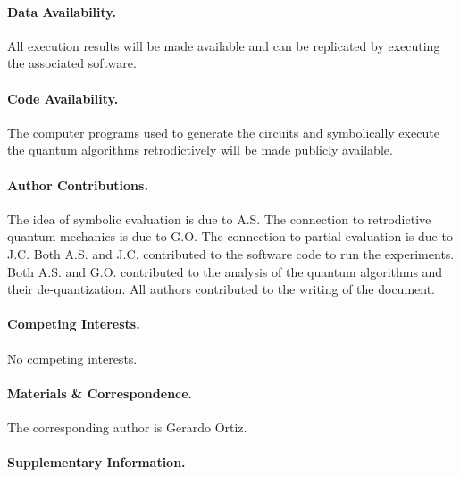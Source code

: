 \documentclass{article}
\newcommand{\red}[1]{{\color{red}{#1}}}
\newcommand{\todo}[1]{\fbox{\begin{minipage}{40em}{\red{#1}}\end{minipage}}}
\begin{document}
\begin{refsection}
\todo{

observer 1 measures wires a,b; obs2 measures wires b,c; not commuting;
each obs gives partial solution to equations; but partial solutions
cannot lead to a global solution
 
KS suggests that equations do not have unique solutions; only
materialize when you measure;

can associate a probability with each variable in a equation: look at
all solutions and see the contribution of each variable to these
solutions.

}

\paragraph*{Data Availability.}
All execution results will be made available and can be replicated by
executing the associated software.

\paragraph*{Code Availability.}
The computer programs used to generate the circuits and symbolically
execute the quantum algorithms retrodictively will be made publicly
available.

\paragraph*{Author Contributions.}
The idea of symbolic evaluation is due to A.S. The connection to
retrodictive quantum mechanics is due to G.O. The connection to
partial evaluation is due to J.C. Both A.S. and J.C. contributed to
the software code to run the experiments. Both A.S. and
G.O. contributed to the analysis of the quantum algorithms and their
de-quantization. All authors contributed to the writing of the
document.

\paragraph*{Competing Interests.}
No competing interests.

\paragraph*{Materials \& Correspondence.}
The corresponding author is Gerardo Ortiz. 

\paragraph*{Supplementary Information.} 
\label{par:shor21}


\end{refsection}
\end{document}
